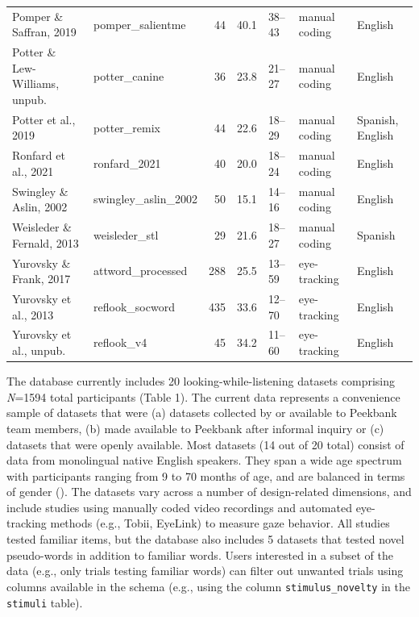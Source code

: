 \documentclass[
  english,
  man,floatsintext]{apa6}
\providecommand{\DIFaddtex}[1]{{\protect\color{blue}\uwave{#1}}} %
\providecommand{\DIFdeltex}[1]{}                      %
\providecommand{\DIFaddbegin}{} %
\providecommand{\DIFaddend}{} %
\providecommand{\DIFdelbegin}{} %
\providecommand{\DIFdelend}{} %
\providecommand{\DIFaddendFL}{} %
\providecommand{\DIFadd}[1]{\texorpdfstring{\DIFaddtex{#1}}{#1}} %
\providecommand{\DIFdel}[1]{\texorpdfstring{\DIFdeltex{#1}}{}} %
\newcommand{\DIFscaledelfig}{0.5}
\newlength{\DIFdelgraphicswidth} %
\newlength{\DIFdelgraphicsheight} %
\newcommand{\DIFaddincludegraphics}[2][]{{\color{blue}\fbox{\DIFOincludegraphics[#1]{#2}}}} %
\newcommand{\DIFdelincludegraphics}[2][]{%
\sbox{\DIFdelgraphicsbox}{\DIFOincludegraphics[#1]{#2}}%
\settoboxwidth{\DIFdelgraphicswidth}{\DIFdelgraphicsbox} %
\settoboxtotalheight{\DIFdelgraphicsheight}{\DIFdelgraphicsbox} %
\scalebox{\DIFscaledelfig}{%
\parbox[b]{\DIFdelgraphicswidth}{\usebox{\DIFdelgraphicsbox}\\[-\baselineskip] \rule{\DIFdelgraphicswidth}{0em}}\llap{\resizebox{\DIFdelgraphicswidth}{\DIFdelgraphicsheight}{%
\setlength{\unitlength}{\DIFdelgraphicswidth}%
\begin{picture}(1,1)%
\thicklines\linethickness{2pt} %
{\color[rgb]{1,0,0}\put(0,0){\framebox(1,1){}}}%
{\color[rgb]{1,0,0}\put(0,0){\line( 1,1){1}}}%
{\color[rgb]{1,0,0}\put(0,1){\line(1,-1){1}}}%
\end{picture}%
}\hspace*{3pt}}} %
} %
\DeclareRobustCommand{\DIFaddbegin}{\DIFOaddbegin \let\includegraphics\DIFaddincludegraphics} %
\DeclareRobustCommand{\DIFaddend}{\DIFOaddend \let\includegraphics\DIFOincludegraphics} %
\DeclareRobustCommand{\DIFdelbegin}{\DIFOdelbegin \let\includegraphics\DIFdelincludegraphics} %
\DeclareRobustCommand{\DIFdelend}{\DIFOaddend \let\includegraphics\DIFOincludegraphics} %
\DeclareRobustCommand{\DIFaddendFL}{\DIFOaddendFL \let\includegraphics\DIFOincludegraphics} %
\begin{document}
\begin{table}
{\begin{tabular}[t]{llrrlll}
Pomper \& Saffran, 2019 & pomper\_salientme & 44 & 40.1 & 38–43 & manual coding & English\\
Potter \& Lew-Williams, unpub. & potter\_canine & 36 & 23.8 & 21–27 & manual coding & English\\
Potter et al., 2019 & potter\_remix & 44 & 22.6 & 18–29 & manual coding & Spanish, English\\
Ronfard et al., 2021 & ronfard\_2021 & 40 & 20.0 & 18–24 & manual coding & English\\
Swingley \& Aslin, 2002 & swingley\_aslin\_2002 & 50 & 15.1 & 14–16 & manual coding & English\\
Weisleder \& Fernald, 2013 & weisleder\_stl & 29 & 21.6 & 18–27 & manual coding & Spanish\\
Yurovsky \& Frank, 2017 & attword\_processed & 288 & 25.5 & 13–59 & eye-tracking & English\\
Yurovsky et al., 2013 & reflook\_socword & 435 & 33.6 & 12–70 & eye-tracking & English\\
Yurovsky et al., unpub. & reflook\_v4 & 45 & 34.2 & 11–60 & eye-tracking & English\\
\bottomrule
\end{tabular}}
\DIFaddendFL \end{table}

The database currently includes 20 looking-while-listening datasets comprising \emph{N}=1594 total participants (Table 1).
The current data represents a convenience sample of datasets that were (a) datasets collected by or available to Peekbank team members, (b) made available to Peekbank after informal inquiry or (c) datasets that were openly available.
Most datasets (14 out of 20 total) consist of data from monolingual native English speakers.
They span a wide age spectrum with participants ranging from 9 to 70 months of age, and are balanced in terms of gender (\DIFdelbegin \DIFdel{47\% female}\DIFdelend \DIFaddbegin \DIFadd{47.30\% female; 50.40\% male; 2.30\% unreported}\DIFaddend ).
The datasets vary across a number of design-related dimensions, and include studies using manually coded video recordings and automated eye-tracking methods (e.g., Tobii, EyeLink) to measure gaze behavior.
All studies tested familiar items, but the database also includes 5 datasets that tested novel pseudo-words in addition to familiar words.
Users interested in a subset of the data (e.g., only trials testing familiar words) can filter out unwanted trials using columns available in the schema (e.g., using the column \texttt{stimulus\_novelty} in the \texttt{stimuli} table).
\end{document}
